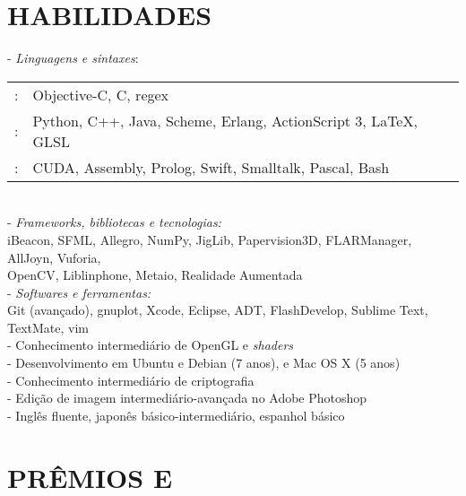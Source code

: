 \documentclass[]{res} %
\def \divspace{6pt}
\begin{document}
\begin{resume}
\section{HABILIDADES \hspace{\divspace} }

- {\sl Linguagens e sintaxes}: \\
\setlength\tabcolsep{2pt}
\begin{tabular}{r l}
\hspace*{1.5em}{\sl Fluente}:& Objective-C, C, regex \\
\hspace*{1.5em}{\sl Muito Familiar}:& Python, C++, Java, Scheme, Erlang, ActionScript 3, \LaTeX, GLSL \\
\hspace*{1.5em}{\sl Pouco Familiar}:& CUDA, Assembly, Prolog, Swift, Smalltalk, Pascal, Bash \\
\end{tabular}
\\
- {\sl Frameworks, bibliotecas e tecnologias:} \\
\hspace*{1.5em}iBeacon, SFML, Allegro, NumPy, JigLib, Papervision3D, FLARManager, AllJoyn, Vuforia, \\
\hspace*{1.5em}OpenCV, Liblinphone, Metaio, Realidade Aumentada
\\
- {\sl Softwares e ferramentas:} \\
\hspace*{1.5em}Git (avançado), gnuplot, Xcode, Eclipse, ADT, FlashDevelop, Sublime Text, TextMate, vim
\\
- Conhecimento intermediário de OpenGL e {\it shaders} \\
- Desenvolvimento em Ubuntu e Debian (7 anos), e Mac OS X (5 anos) \\
- Conhecimento intermediário de criptografia \\
- Edição de imagem intermediário-avançada no Adobe Photoshop \\
- Inglês fluente, japonês básico-intermediário, espanhol básico

\section{PRÊMIOS E \hspace{\divspace} }

\end{resume}
\end{document}
